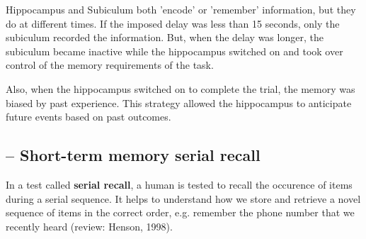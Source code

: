 \begin{enumerate}
\begin{mdframed}

  Hippocampus and Subiculum both 'encode' or 'remember' information, but they do
  at different times. If the imposed delay was less than 15 seconds, only the
  subiculum recorded the information. But, when the delay was longer, the
  subiculum became inactive while the hippocampus switched on and took over
  control of the memory requirements of the task.
  
  Also, when the hippocampus switched on to complete
  the trial, the memory was biased by past experience. This strategy allowed the
  hippocampus to anticipate future events based on past outcomes.

\end{mdframed}
\end{enumerate}
  

\subsection{-- Short-term memory serial recall}
\label{sec:short-term-memory-serial-recall}	

In a test called {\bf serial recall}, a human is tested to recall the occurence
of items during a serial sequence.
It helps to understand how we store and retrieve a novel sequence of items in
the correct order, e.g. remember the phone number that we recently heard
(review: Henson, 1998).

